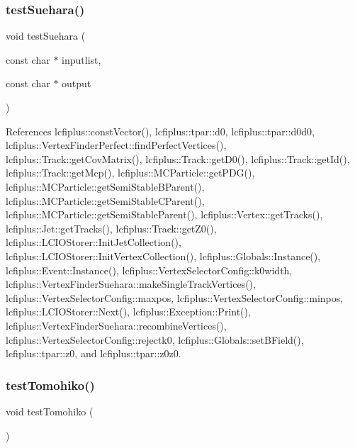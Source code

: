 \subsubsection{test\+Suehara()}
{\footnotesize\ttfamily void test\+Suehara (\begin{DoxyParamCaption}\item[{const char $\ast$}]{inputlist,  }\item[{const char $\ast$}]{output }\end{DoxyParamCaption})}



References lcfiplus\+::const\+Vector(), lcfiplus\+::tpar\+::d0, lcfiplus\+::tpar\+::d0d0, lcfiplus\+::\+Vertex\+Finder\+Perfect\+::find\+Perfect\+Vertices(), lcfiplus\+::\+Track\+::get\+Cov\+Matrix(), lcfiplus\+::\+Track\+::get\+D0(), lcfiplus\+::\+Track\+::get\+Id(), lcfiplus\+::\+Track\+::get\+Mcp(), lcfiplus\+::\+M\+C\+Particle\+::get\+P\+D\+G(), lcfiplus\+::\+M\+C\+Particle\+::get\+Semi\+Stable\+B\+Parent(), lcfiplus\+::\+M\+C\+Particle\+::get\+Semi\+Stable\+C\+Parent(), lcfiplus\+::\+M\+C\+Particle\+::get\+Semi\+Stable\+Parent(), lcfiplus\+::\+Vertex\+::get\+Tracks(), lcfiplus\+::\+Jet\+::get\+Tracks(), lcfiplus\+::\+Track\+::get\+Z0(), lcfiplus\+::\+L\+C\+I\+O\+Storer\+::\+Init\+Jet\+Collection(), lcfiplus\+::\+L\+C\+I\+O\+Storer\+::\+Init\+Vertex\+Collection(), lcfiplus\+::\+Globals\+::\+Instance(), lcfiplus\+::\+Event\+::\+Instance(), lcfiplus\+::\+Vertex\+Selector\+Config\+::k0width, lcfiplus\+::\+Vertex\+Finder\+Suehara\+::make\+Single\+Track\+Vertices(), lcfiplus\+::\+Vertex\+Selector\+Config\+::maxpos, lcfiplus\+::\+Vertex\+Selector\+Config\+::minpos, lcfiplus\+::\+L\+C\+I\+O\+Storer\+::\+Next(), lcfiplus\+::\+Exception\+::\+Print(), lcfiplus\+::\+Vertex\+Finder\+Suehara\+::recombine\+Vertices(), lcfiplus\+::\+Vertex\+Selector\+Config\+::rejectk0, lcfiplus\+::\+Globals\+::set\+B\+Field(), lcfiplus\+::tpar\+::z0, and lcfiplus\+::tpar\+::z0z0.

\mbox{\label{Driver_8cc_a5584b04f50c33cf378d710da731c1e59}} 
\subsubsection{test\+Tomohiko()}
{\footnotesize\ttfamily void test\+Tomohiko (\begin{DoxyParamCaption}{ }\end{DoxyParamCaption})}



